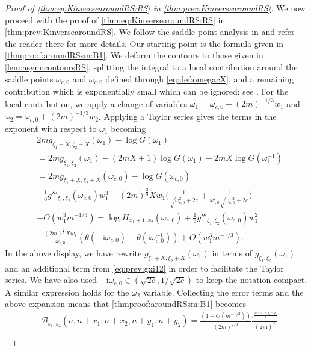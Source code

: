 \documentclass[11pt,twoside]{amsart}
\theoremstyle{plain}
\numberwithin{quest}{section}
\theoremstyle{remark}
\numberwithin{rem}{section}
\theoremstyle{definition}
\newcommand{\eps}{\varepsilon}
\begin{document}
\begin{proof}[Proof of \eqref{thm:eq:KinversearoundRS:RS} in \cref{thm:prev:KinversearoundRS}]
    We now proceed with the proof of \eqref{thm:eq:KinversearoundRS:RS} in \cref{thm:prev:KinversearoundRS}.
		We follow the saddle point analysis in \cite[Proposition 3.17]{CJ16} and refer the reader there for more details. 
		Our starting point is the formula given in \eqref{thmproof:aroundRSsm:B1}.   We deform the contours to those given in \cref{lem:asym:contoursRS}, splitting the integral to a local contribution around the saddle points $\omega_{c,0}$ and $\tilde{\omega}_{c,0}$ defined through \eqref{eq:def:omegacX}, and a remaining contribution which is exponentially small which can be ignored; see \cite[Proposition 3.17]{CJ16}.  For the local contribution, we apply a change of variables $\omega_1=\omega_{c,0}+(2m)^{-1/3}w_1$ and $\omega_2=\tilde{\omega}_{c,0}+(2m)^{-1/3}w_2$.  Applying a  Taylor series gives the terms in the exponent with respect to $\omega_1$ becoming
		\begin{equation*}
			\begin{split}
				&2m g_{\xi_1+X,\xi_2+X}(\omega_1) -\log G(\omega_1) \\&=
2m g_{\xi_1,\xi_2}(\omega_1) -(2mX+1)\log G(\omega_1) +2mX \log G(\omega_1^{-1})
\\&=2m g_{\xi_1+X,\xi_2+X}(\omega_{c,0}) -\log G(\omega_{c,0})\\
				&+\frac{1}{6}g'''_{\xi_1,\xi_2}(\omega_{c,0})w_1^3 +(2m)^{\frac{2}{3}}Xw_1\bigg(\frac{1}{\sqrt{\omega_{c,0}^2+2c}}+\frac{1}{\omega_{c,0}^2\sqrt{\omega_{c,0}^{-2}+2c}}\bigg)\\
				& +O(w_1^3m^{-1/3})=\log H_{x_1+1,x_2}(\omega_{c,0})
				+\frac{1}{6}g'''_{\xi_1,\xi_2}(\omega_{c,0})w_1^2\\&+\frac{(2m)^{\frac{2}{3}}Xw_1}{\omega_{c,0}} (\theta (-\mathrm{i}\omega_{c,0})-\theta(\mathrm{i}\omega_{c,0}^{-1}))+O(w_1^3m^{-1/3}).
			\end{split}
		\end{equation*}
		 In the above display, we have rewrite $g_{\xi_1+X,\xi_2+X}(\omega_1) $ in terms of $g_{\xi_1,\xi_2}(\omega_1)$ and an additional term from \eqref{eq:prev:gxi12} in order to facilitate the Taylor series. We have also used $-\mathrm{i}\omega_{c,0}\in (\sqrt{2c},1/\sqrt{2c})$  to keep the notation compact. 
	A similar expression holds for the $\omega_2$ variable. 	
    Collecting the error terms and the above expansion means that \eqref{thmproof:aroundRSsm:B1} becomes
		\begin{equation*}
			\begin{split}
				&\mathcal{B}_{\eps_1,\eps_2}(a,n+x_1,n+x_2,n+y_1,n+y_2)=\frac{(1+O(m^{-1/3}))}{(2m)^{2/3}}\frac{\mathrm{i}^{\frac{x_2-x_1+y_1-y_2}{2}}}{(2\pi \mathrm{i})^2}  \\

\end{split}
\end{equation*}
\end{proof}
\end{document}
